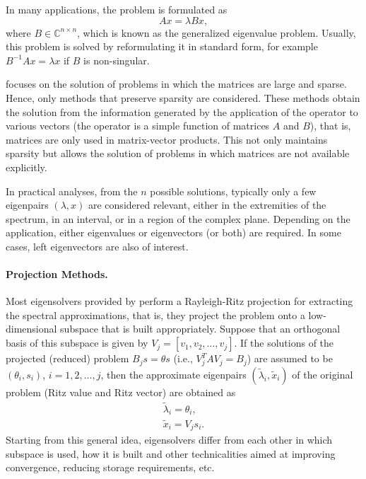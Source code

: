 	In many applications, the problem is formulated as
\begin{equation}
Ax=\lambda Bx,\label{eq:eiggen}
\end{equation}
where $B\in\mathbb{C}^{n\times n}$, which is known as the generalized eigenvalue problem. Usually, this problem is solved by reformulating it in standard form, for example $B^{-1}Ax=\lambda x$ if $B$ is non-singular.

	\slepc focuses on the solution of problems in which the matrices are large and sparse. Hence, only methods that preserve sparsity are considered.
	These methods obtain the solution from the information generated by the application of the operator to various vectors (the operator is a simple function of matrices $A$ and $B$), that is, matrices are only used in matrix-vector products. This not only maintains sparsity but allows the solution of problems in which matrices are not available explicitly.

In practical analyses, from the $n$ possible solutions, typically only a few eigenpairs $(\lambda,x)$ are considered relevant, either in the extremities of the spectrum, in an interval, or in a region of the complex plane.
Depending on the application, either eigenvalues or eigenvectors (or both) are required. In some cases, left eigenvectors are also of interest.

\paragraph{Projection Methods.}

	Most eigensolvers provided by \slepc perform a Rayleigh-Ritz projection for extracting the spectral approximations, that is, they project the problem onto a low-dimensional subspace that is built appropriately. Suppose that an orthogonal basis of this subspace is given by $V_j=[v_1,v_2,\ldots,v_j]$. If the solutions of the projected (reduced) problem $B_js=\theta s$ (i.e., $V_j^TAV_j=B_j$) are assumed to be $(\theta_i,s_i)$, $i=1,2,\ldots,j$, then the approximate eigenpairs $(\tilde{\lambda}_i,\tilde{x}_i)$ of the original problem (Ritz value and Ritz vector) are obtained as
\begin{eqnarray}
\tilde{\lambda}_i=\theta_i,\\
\tilde{x}_i=V_js_i.
\end{eqnarray}
Starting from this general idea, eigensolvers differ from each other in which subspace is used, how it is built and other technicalities aimed at improving convergence, reducing storage requirements, etc.

